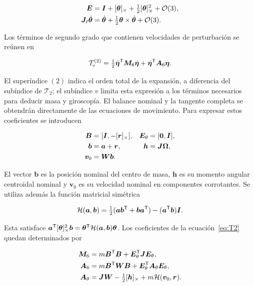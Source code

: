 \begin{align}
\bm E&=\bm I+[\bm{\theta}]_\times+\tfrac12[\bm{\theta}]_\times^2+\mathcal O(3),\nonumber\\
\bm J_\ell\dot{\bm\theta}&=\dot{\bm\theta}
+\tfrac12\bm\theta\times\dot{\bm\theta}+\mathcal O(3).
\end{align}

Los términos de segundo grado que contienen velocidades de perturbación se reúnen en

\begin{equation}
\mathcal T_v^{(2)}=\tfrac12\dot{\bm\eta}^\mathsf T\bm M_6\dot{\bm\eta}
+\dot{\bm\eta}^\mathsf T\bm A_6\bm\eta.
\label{eq:T2}
\end{equation}

El superíndice $(2)$ indica el orden total de la expansión, a diferencia del subíndice de $\mathcal T_2$; el subíndice $v$ limita esta expresión a los términos necesarios para deducir masa y giroscopía. El balance nominal y la tangente completa se obtendrán directamente de las ecuaciones de movimiento. Para expresar estos coeficientes se introducen

\begin{align}
\bm B&=[\bm I,-[\bm{r}]_\times],&\bm E_\theta&=[\bm0,\bm I],\nonumber\\
\bm b&=\bm a+\bm r,&\bm h&=\bm J\bm\Omega,\nonumber\\
\bm v_0&=\bm W\bm b.
\end{align}

El vector $\bm b$ es la posición nominal del centro de masa, $\bm h$ es su momento angular centroidal nominal y $\bm v_0$ es su velocidad nominal en componentes corrotantes. Se utiliza además la función matricial simétrica

\begin{equation}
\mathcal H(\bm a,\bm b)=\tfrac12(\bm a\bm b^\mathsf T+\bm b\bm a^\mathsf T)
-(\bm a^\mathsf T\bm b)\bm I.
\end{equation}

Esta satisface $\bm a^\mathsf T[\bm{\theta}]_\times^2\bm b=\bm\theta^\mathsf T\mathcal H(\bm a,\bm b)\bm\theta$. Los coeficientes de la ecuación~\eqref{eq:T2} quedan determinados por

\begin{align}
\bm M_6&=m\bm B^\mathsf T\bm B+\bm E_\theta^\mathsf T\bm J\bm E_\theta,\label{eq:M6}\\
\bm A_6&=m\bm B^\mathsf T\bm W\bm B+\bm E_\theta^\mathsf T\bm A_\theta\bm E_\theta,\nonumber\\
\bm A_\theta&=\bm J\bm W-\tfrac12[\bm{h}]_\times+m\mathcal H(\bm v_0,\bm r).
\label{eq:A6}
\end{align}

